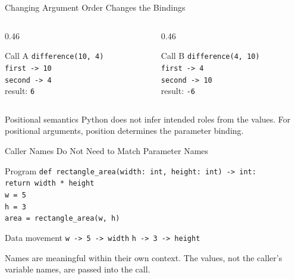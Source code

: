 \documentclass[aspectratio=169,10pt]{beamer}
\begin{document}
\begin{frame}{Changing Argument Order Changes the Bindings}
  \begin{columns}[T,onlytextwidth]
    \begin{column}{0.46\textwidth}
      \begin{block}{Call A}
        \texttt{difference(10, 4)}\\[0.08in]
        \texttt{first -> 10}\\
        \texttt{second -> 4}\\[0.08in]
        result: \texttt{6}
      \end{block}
    \end{column}

    \begin{column}{0.46\textwidth}
      \begin{block}{Call B}
        \texttt{difference(4, 10)}\\[0.08in]
        \texttt{first -> 4}\\
        \texttt{second -> 10}\\[0.08in]
        result: \texttt{-6}
      \end{block}
    \end{column}
  \end{columns}

  \begin{alertblock}{Positional semantics}
    Python does not infer intended roles from the values. For positional arguments, position determines the parameter binding.
  \end{alertblock}
\end{frame}

\begin{frame}{Caller Names Do Not Need to Match Parameter Names}
  \begin{block}{Program}
    \texttt{def rectangle\_area(width: int, height: int) -> int:}\\
    \hspace*{0.22in}\texttt{return width * height}\\[0.08in]
    \texttt{w = 5}\\
    \texttt{h = 3}\\
    \texttt{area = rectangle\_area(w, h)}
  \end{block}

  \begin{block}{Data movement}
    \centering
    \texttt{w -> 5 -> width}
    \qquad
    \texttt{h -> 3 -> height}
  \end{block}

  \begin{keyidea}
    Names are meaningful within their own context. The values, not the caller's variable names, are passed into the call.
  \end{keyidea}
\end{frame}
\end{document}
